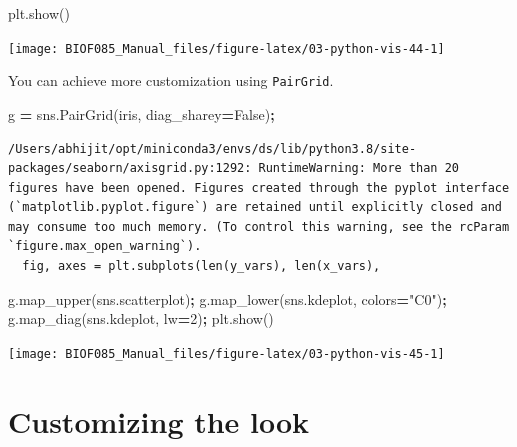 \documentclass[
  letterpaper,
]{scrbook}
\newenvironment{Shaded}{\begin{snugshade}}{\end{snugshade}}
\newcommand{\DecValTok}[1]{\textcolor[rgb]{0.00,0.00,0.81}{#1}}
\newcommand{\NormalTok}[1]{#1}
\newcommand{\OperatorTok}[1]{\textcolor[rgb]{0.81,0.36,0.00}{\textbf{#1}}}
\newcommand{\StringTok}[1]{\textcolor[rgb]{0.31,0.60,0.02}{#1}}
\newcommand{\VariableTok}[1]{\textcolor[rgb]{0.00,0.00,0.00}{#1}}
\begin{document}
\begin{Shaded}
\begin{Highlighting}[]
\NormalTok{plt.show()}
\end{Highlighting}
\end{Shaded}

\begin{center}\texttt{[image: BIOF085\_Manual\_files/figure-latex/03-python-vis-44-1]} \end{center}

You can achieve more customization using \texttt{PairGrid}.

\begin{Shaded}
\begin{Highlighting}[]
\NormalTok{g }\OperatorTok{=}\NormalTok{ sns.PairGrid(iris, diag_sharey}\OperatorTok{=}\VariableTok{False}\NormalTok{)}\OperatorTok{;}
\end{Highlighting}
\end{Shaded}

\begin{verbatim}
/Users/abhijit/opt/miniconda3/envs/ds/lib/python3.8/site-packages/seaborn/axisgrid.py:1292: RuntimeWarning: More than 20 figures have been opened. Figures created through the pyplot interface (`matplotlib.pyplot.figure`) are retained until explicitly closed and may consume too much memory. (To control this warning, see the rcParam `figure.max_open_warning`).
  fig, axes = plt.subplots(len(y_vars), len(x_vars),
\end{verbatim}

\begin{Shaded}
\begin{Highlighting}[]
\NormalTok{g.map_upper(sns.scatterplot)}\OperatorTok{;}
\NormalTok{g.map_lower(sns.kdeplot, colors}\OperatorTok{=}\StringTok{"C0"}\NormalTok{)}\OperatorTok{;}
\NormalTok{g.map_diag(sns.kdeplot, lw}\OperatorTok{=}\DecValTok{2}\NormalTok{)}\OperatorTok{;}
\NormalTok{plt.show()}
\end{Highlighting}
\end{Shaded}

\begin{center}\texttt{[image: BIOF085\_Manual\_files/figure-latex/03-python-vis-45-1]} \end{center}

\hypertarget{customizing-the-look}{%
\section{Customizing the look}\label{customizing-the-look}}
\end{document}
